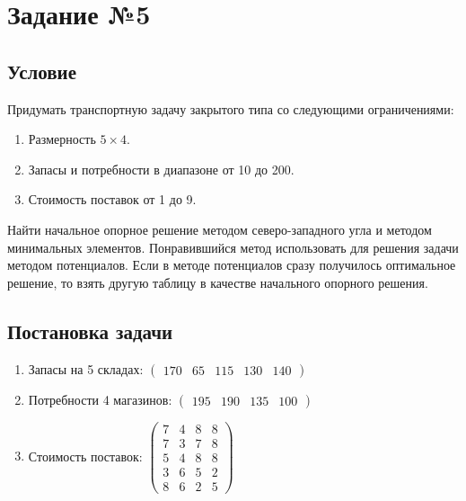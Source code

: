 \section{Задание №5}

\subsection{Условие}\label{05-lab-condition}

Придумать транспортную задачу закрытого типа со следующими ограничениями:
\begin{enumerate}
    \item Размерность $5 \times 4$.
    \item Запасы и потребности в диапазоне от 10 до 200.
    \item Стоимость поставок от 1 до 9.
\end{enumerate}

Найти начальное опорное решение методом северо-западного угла и методом минимальных элементов.
Понравившийся метод использовать для решения задачи методом потенциалов.
Если в методе потенциалов сразу получилось оптимальное решение, то взять другую таблицу в качестве начального опорного решения.

\subsection{Постановка задачи}\label{05-lab-statement}


\begin{enumerate}
    \item Запасы на 5 складах: $\begin{pmatrix}
                  170 & 65 & 115 & 130 & 140
              \end{pmatrix}$
    \item Потребности 4 магазинов: $\begin{pmatrix}
                  195 & 190 & 135 & 100
              \end{pmatrix}$
    \item Стоимость поставок: $\begin{pmatrix}
                  7 & 4 & 8 & 8 \\
                  7 & 3 & 7 & 8 \\
                  5 & 4 & 8 & 8 \\
                  3 & 6 & 5 & 2 \\
                  8 & 6 & 2 & 5
              \end{pmatrix}$
\end{enumerate}

